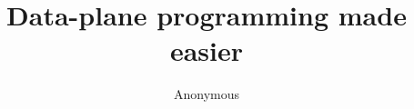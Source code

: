 \documentclass{hotnets15}
\begin{document}
 {}
\date{}


\title{Data-plane programming made easier}

\author{Anonymous}

\maketitle


~\cite{vanjacobson}








 
\begin{small}

\end{small}
\label{last-page}
\end{document}

